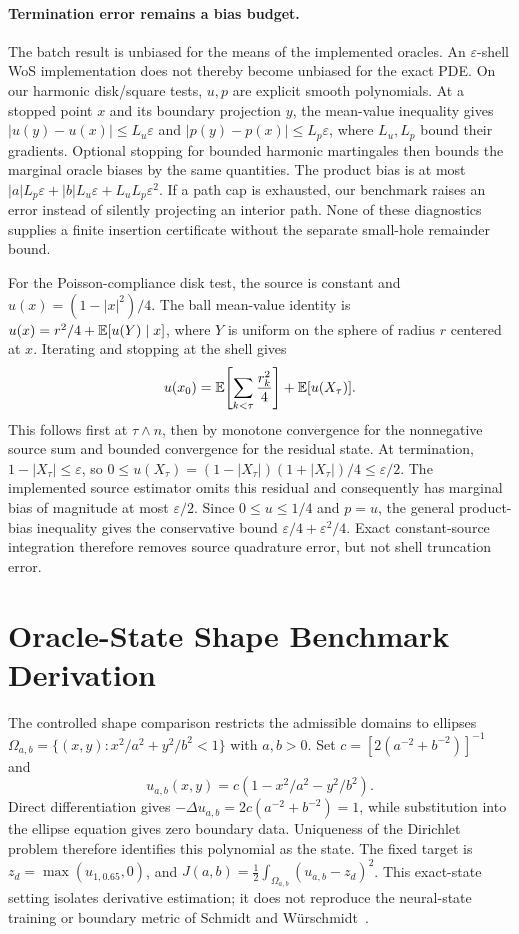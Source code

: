 \paragraph{Termination error remains a bias budget.}
The batch result is unbiased for the means of the implemented oracles.
An $\varepsilon$-shell WoS implementation does not thereby become unbiased
for the exact PDE.  On our harmonic disk/square tests, $u,p$ are explicit
smooth polynomials.  At a stopped point $x$ and its boundary projection $y$,
the mean-value inequality gives
$|u(y)-u(x)|\le L_u\varepsilon$ and
$|p(y)-p(x)|\le L_p\varepsilon$, where $L_u,L_p$ bound their gradients.
Optional stopping for bounded harmonic martingales then bounds the marginal
oracle biases by the same quantities.  The product bias is at most
$|a|L_p\varepsilon+|b|L_u\varepsilon+L_uL_p\varepsilon^2$.
If a path cap is exhausted, our benchmark raises an error instead of silently
projecting an interior path.  None of these diagnostics supplies a finite
insertion certificate without the separate small-hole remainder bound.

For the Poisson-compliance disk test, the source is constant and
$u(x)=(1-|x|^2)/4$. The ball mean-value identity is
$u(x)=r^2/4+\mathbb{E}[u(Y)\mid x]$, where $Y$ is uniform on the sphere of radius
$r$ centered at $x$. Iterating and stopping at the shell gives
\begin{equation}
 u(x_0)=\mathbb{E}\!\left[\sum_{k<\tau}\frac{r_k^2}{4}\right]
            +\mathbb{E}[u(X_\tau)].
\end{equation}
This follows first at $\tau\wedge n$, then by monotone convergence for
the nonnegative source sum and bounded convergence for the residual state.
At termination, $1-|X_\tau|\le\varepsilon$, so
$0\le u(X_\tau)=(1-|X_\tau|)(1+|X_\tau|)/4\le\varepsilon/2$.
The implemented source estimator omits this residual and consequently has
marginal bias of magnitude at most $\varepsilon/2$. Since $0\le u\le1/4$
and $p=u$, the general product-bias inequality gives the conservative bound
$\varepsilon/4+\varepsilon^2/4$. Exact constant-source integration therefore
removes source quadrature error, but not shell truncation error.

\section{Oracle-State Shape Benchmark Derivation}
\label{app:shapeoracle}

The controlled shape comparison restricts the admissible domains to ellipses
$\Omega_{a,b}=\{(x,y):x^2/a^2+y^2/b^2<1\}$ with $a,b>0$.
Set $c=[2(a^{-2}+b^{-2})]^{-1}$ and
\begin{equation}
 u_{a,b}(x,y)=c(1-x^2/a^2-y^2/b^2).
\end{equation}
Direct differentiation gives
$-\Delta u_{a,b}=2c(a^{-2}+b^{-2})=1$, while substitution into the ellipse
equation gives zero boundary data.  Uniqueness of the Dirichlet problem
therefore identifies this polynomial as the state.  The fixed target is
$z_d=\max(u_{1,0.65},0)$, and
$J(a,b)=\tfrac12\int_{\Omega_{a,b}}(u_{a,b}-z_d)^2$.
This exact-state setting isolates derivative estimation; it does not reproduce
the neural-state training or boundary metric of Schmidt and
W\"urschmidt~\cite{schmidt2026first}.

